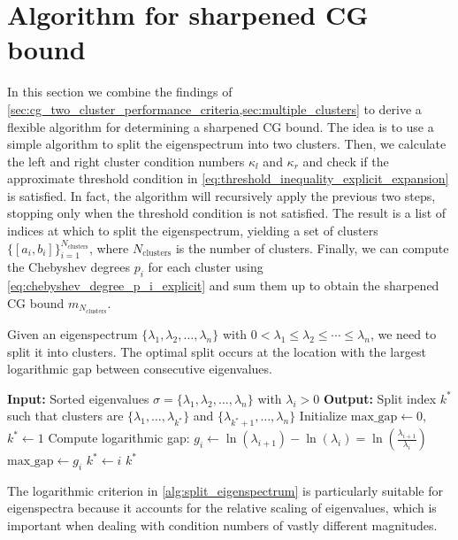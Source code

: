 \section{Algorithm for sharpened CG bound}\label{sec:cg_sharpened_convrate_multiple_clusters_algorithm}
In this section we combine the findings of \cref{sec:cg_two_cluster_performance_criteria,sec:multiple_clusters} to derive a flexible algorithm for determining a sharpened CG bound. The idea is to use a simple algorithm to split the eigenspectrum into two clusters. Then, we calculate the left and right cluster condition numbers $\kappa_l$ and $\kappa_r$ and check if the approximate threshold condition in \cref{eq:threshold_inequality_explicit_expansion} is satisfied. In fact, the algorithm will recursively apply the previous two steps, stopping only when the threshold condition is not satisfied. The result is a list of indices at which to split the eigenspectrum, yielding a set of clusters $\{[a_i, b_i]\}_{i=1}^{N_{\text{clusters}}}$, where $N_{\text{clusters}}$ is the number of clusters. Finally, we can compute the Chebyshev degrees $p_i$ for each cluster using \cref{eq:chebyshev_degree_p_i_explicit} and sum them up to obtain the sharpened CG bound $m_{N_{\text{clusters}}}$.

Given an eigenspectrum $\{\lambda_1, \lambda_2, \ldots, \lambda_n\}$ with $0 < \lambda_1 \leq \lambda_2 \leq \cdots \leq \lambda_n$, we need to split it into clusters. The optimal split occurs at the location with the largest logarithmic gap between consecutive eigenvalues.
\begin{algorithm}[H]
    \caption{$\operatorname{SplitEigenspectrum}(\sigma)$}
    \begin{algorithmic}[1]
        \State \textbf{Input:} Sorted eigenvalues $\sigma = \{\lambda_1, \lambda_2, \ldots, \lambda_n\}$ with $\lambda_i > 0$
        \State \textbf{Output:} Split index $k^*$ such that clusters are $\{\lambda_1, \ldots, \lambda_{k^*}\}$ and $\{\lambda_{k^*+1}, \ldots, \lambda_n\}$
        \State Initialize $\text{max\_gap} \gets 0$, $k^* \gets 1$
            \State Compute logarithmic gap: $g_i \gets \ln(\lambda_{i+1}) - \ln(\lambda_i) = \ln\left(\frac{\lambda_{i+1}}{\lambda_i}\right)$
                \State $\text{max\_gap} \gets g_i$
                \State $k^* \gets i$
            \EndIf
        \EndFor
        \State \Return $k^*$
    \end{algorithmic}
    \label{alg:split_eigenspectrum}
\end{algorithm}
The logarithmic criterion in \cref{alg:split_eigenspectrum} is particularly suitable for eigenspectra because it accounts for the relative scaling of eigenvalues, which is important when dealing with condition numbers of vastly different magnitudes.

